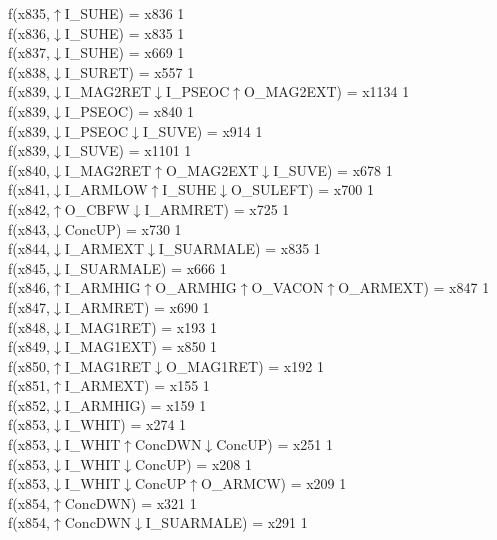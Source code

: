 f(x835,$\uparrow$I\_SUHE) = x836 {1} \\
f(x836,$\downarrow$I\_SUHE) = x835 {1} \\
f(x837,$\downarrow$I\_SUHE) = x669 {1} \\
f(x838,$\downarrow$I\_SURET) = x557 {1} \\
f(x839,$\downarrow$I\_MAG2RET$\downarrow$I\_PSEOC$\uparrow$O\_MAG2EXT) = x1134 {1} \\
f(x839,$\downarrow$I\_PSEOC) = x840 {1} \\
f(x839,$\downarrow$I\_PSEOC$\downarrow$I\_SUVE) = x914 {1} \\
f(x839,$\downarrow$I\_SUVE) = x1101 {1} \\
f(x840,$\downarrow$I\_MAG2RET$\uparrow$O\_MAG2EXT$\downarrow$I\_SUVE) = x678 {1} \\
f(x841,$\downarrow$I\_ARMLOW$\uparrow$I\_SUHE$\downarrow$O\_SULEFT) = x700 {1} \\
f(x842,$\uparrow$O\_CBFW$\downarrow$I\_ARMRET) = x725 {1} \\
f(x843,$\downarrow$ConcUP) = x730 {1} \\
f(x844,$\downarrow$I\_ARMEXT$\downarrow$I\_SUARMALE) = x835 {1} \\
f(x845,$\downarrow$I\_SUARMALE) = x666 {1} \\
f(x846,$\uparrow$I\_ARMHIG$\uparrow$O\_ARMHIG$\uparrow$O\_VACON$\uparrow$O\_ARMEXT) = x847 {1} \\
f(x847,$\downarrow$I\_ARMRET) = x690 {1} \\
f(x848,$\downarrow$I\_MAG1RET) = x193 {1} \\
f(x849,$\downarrow$I\_MAG1EXT) = x850 {1} \\
f(x850,$\uparrow$I\_MAG1RET$\downarrow$O\_MAG1RET) = x192 {1} \\
f(x851,$\uparrow$I\_ARMEXT) = x155 {1} \\
f(x852,$\downarrow$I\_ARMHIG) = x159 {1} \\
f(x853,$\downarrow$I\_WHIT) = x274 {1} \\
f(x853,$\downarrow$I\_WHIT$\uparrow$ConcDWN$\downarrow$ConcUP) = x251 {1} \\
f(x853,$\downarrow$I\_WHIT$\downarrow$ConcUP) = x208 {1} \\
f(x853,$\downarrow$I\_WHIT$\downarrow$ConcUP$\uparrow$O\_ARMCW) = x209 {1} \\
f(x854,$\uparrow$ConcDWN) = x321 {1} \\
f(x854,$\uparrow$ConcDWN$\downarrow$I\_SUARMALE) = x291 {1} \\
